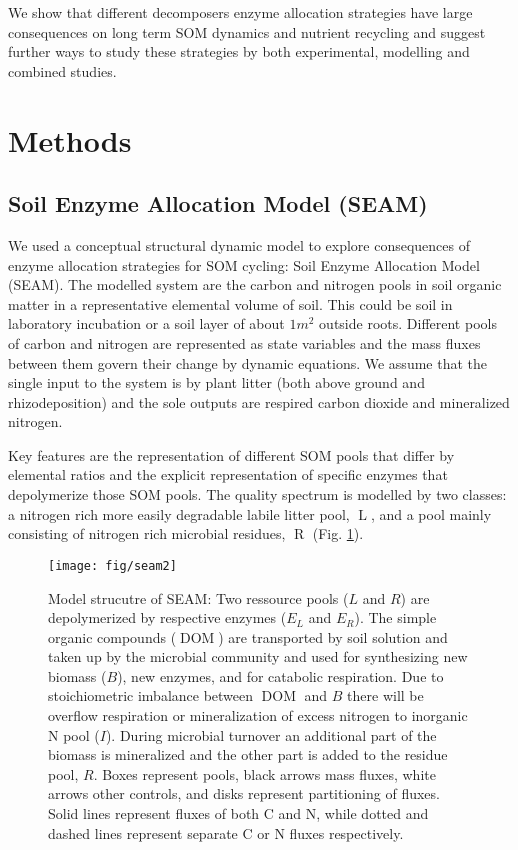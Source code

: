 We show that different decomposers enzyme allocation strategies have large
consequences on long term SOM dynamics and nutrient recycling and suggest
further ways to study these strategies by both experimental, modelling and
combined studies.

\section{Methods}
\subsection{Soil Enzyme Allocation Model (SEAM)}
We used a conceptual structural dynamic model to explore consequences of enzyme
allocation strategies for SOM cycling: Soil Enzyme Allocation Model (SEAM). The
modelled system are the carbon and nitrogen pools in soil organic matter in a
representative elemental volume of soil. This could be soil in laboratory
incubation or a soil layer of about $1 \unit{m}^2$ outside roots. Different
pools of carbon and nitrogen are represented as state variables and the mass
fluxes between them govern their change by dynamic equations. We assume that the
single input to the system is by plant litter (both above ground and
rhizodeposition) and the sole outputs are respired carbon dioxide and
mineralized nitrogen. 

Key features are the representation of different SOM pools that differ by
elemental ratios and the explicit representation of specific enzymes that
depolymerize those SOM pools. The quality spectrum is modelled by two
classes: a nitrogen rich more easily degradable labile litter pool,
$\operatorname{L}$, and a pool mainly consisting of nitrogen rich microbial
residues, $\operatorname{R}$ (Fig. \ref{fig:SEAM}).

\begin{figure}[t] \vspace*{2mm}
\label{fig:SEAM}
\begin{center}
\texttt{[image: fig/seam2]}
\end{center}
\caption{Model strucutre of SEAM: Two ressource pools ($L$ and
$R$) are depolymerized by respective enzymes
($E_L$ and $E_R$). The simple organic
compounds ($\operatorname{DOM}$) are transported by soil solution and taken up
by the microbial community  and used for synthesizing
new biomass (${B}$), new enzymes, and for catabolic respiration. 
Due to stoichiometric imbalance between $\operatorname{DOM}$ and ${B}$
there will be overflow respiration or mineralization of excess nitrogen to
inorganic N pool ($I$).
During microbial turnover an additional part of the biomass is mineralized and the
other part is added to the residue pool, $R$. Boxes represent pools, black
arrows mass fluxes, white arrows other controls, and disks represent
partitioning of fluxes. Solid lines represent fluxes of both C and N, while
dotted and dashed lines represent separate C or N fluxes respectively.}
\end{figure}

